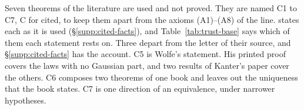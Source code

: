 Seven theorems of the literature are used and not proved. They are named C1 to C7, C for cited,
to keep them apart from the axioms (A1)--(A8) of the line. \suppl{} states each as it is used
(\S\ref{supp:cited-facts}), and Table~\ref{tab:trust-base} says which of them each statement
rests on. Three depart from the letter of their source, and \S\ref{supp:cited-facts} has the
account. C5 is Wolfe's statement. His printed proof covers the laws with no Gaussian part, and
two results of Kanter's paper  cover the others. C6 composes two
theorems of
one book and leaves out the uniqueness that the book states. C7 is one direction of an
equivalence, under narrower hypotheses.
